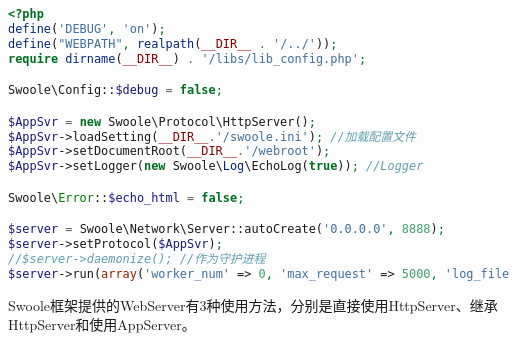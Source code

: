 \begin{lstlisting}[language=PHP]
<?php
define('DEBUG', 'on');
define("WEBPATH", realpath(__DIR__ . '/../'));
require dirname(__DIR__) . '/libs/lib_config.php';

Swoole\Config::$debug = false;

$AppSvr = new Swoole\Protocol\HttpServer();
$AppSvr->loadSetting(__DIR__.'/swoole.ini'); //加载配置文件
$AppSvr->setDocumentRoot(__DIR__.'/webroot');
$AppSvr->setLogger(new Swoole\Log\EchoLog(true)); //Logger

Swoole\Error::$echo_html = false;

$server = Swoole\Network\Server::autoCreate('0.0.0.0', 8888);
$server->setProtocol($AppSvr);
//$server->daemonize(); //作为守护进程
$server->run(array('worker_num' => 0, 'max_request' => 5000, 'log_file' => '/tmp/swoole.log'));
\end{lstlisting}



Swoole框架提供的WebServer有3种使用方法，分别是直接使用HttpServer、继承HttpServer和使用AppServer。

